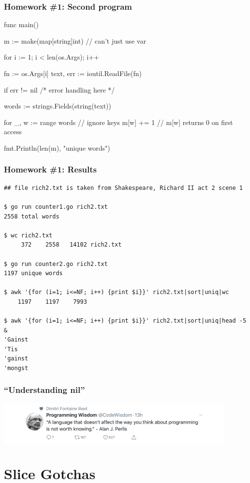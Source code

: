 \documentclass[handout,compress,t,11pt]{beamer}
\begin{document}
\begin{frame}[fragile]
\frametitle{Homework \#1: Second program}
\begin{golang}
func main() {
    m := make(map[string]int)  // can't just use var

    for i := 1; i < len(os.Args); i++ {
        fn := os.Args[i]
        text, err := ioutil.ReadFile(fn)

        if err != nil { /* error handling here */ }

        words := strings.Fields(string(text))

        for _, w := range words {  // ignore keys
            m[w] += 1  // m[w] returns 0 on first access
        }
    }

    fmt.Println(len(m), "unique words")
}
\end{golang}
\end{frame}

\begin{frame}[fragile]
\frametitle{Homework \#1: Results}
{\scriptsize
\begin{verbatim}
## file rich2.txt is taken from Shakespeare, Richard II act 2 scene 1

$ go run counter1.go rich2.txt
2558 total words

$ wc rich2.txt
     372    2558   14102 rich2.txt

$ go run counter2.go rich2.txt
1197 unique words

$ awk '{for (i=1; i<=NF; i++) {print $i}}' rich2.txt|sort|uniq|wc
    1197    1197    7993

$ awk '{for (i=1; i<=NF; i++) {print $i}}' rich2.txt|sort|uniq|head -5
&
'Gainst
'Tis
'gainst
'mongst
\end{verbatim}}
\end{frame}

\begin{frame}[fragile]
\frametitle{``Understanding nil''}
\begin{center}
\includegraphics[width=0.9\textwidth]{new-language-quote.png}
\end{center}
\end{frame}

\section{Slice Gotchas}
\end{document}
